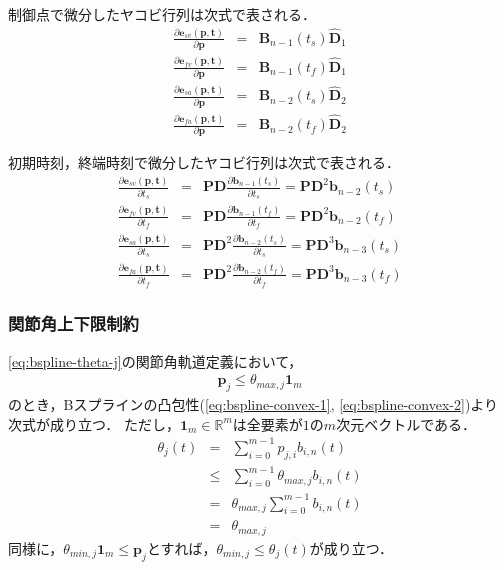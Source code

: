 制御点で微分したヤコビ行列は次式で表される．
\begin{eqnarray}
  \frac{\partial \bm{e}_{sv}(\bm{p}, \bm{t})}{\partial \bm{p}} &=& \bm{B}_{n-1}(t_s) \bm{\hat{D}}_1 \label{eq:bspline-stationery-task-jacobian-with-control-sv} \\
  \frac{\partial \bm{e}_{fv}(\bm{p}, \bm{t})}{\partial \bm{p}} &=& \bm{B}_{n-1}(t_f) \bm{\hat{D}}_1 \label{eq:bspline-stationery-task-jacobian-with-control-fv} \\
  \frac{\partial \bm{e}_{sa}(\bm{p}, \bm{t})}{\partial \bm{p}} &=& \bm{B}_{n-2}(t_s) \bm{\hat{D}}_2 \label{eq:bspline-stationery-task-jacobian-with-control-sa} \\
  \frac{\partial \bm{e}_{fa}(\bm{p}, \bm{t})}{\partial \bm{p}} &=& \bm{B}_{n-2}(t_f) \bm{\hat{D}}_2 \label{eq:bspline-stationery-task-jacobian-with-control-fa}
\end{eqnarray}

初期時刻，終端時刻で微分したヤコビ行列は次式で表される．
\begin{eqnarray}
  \frac{\partial \bm{e}_{sv}(\bm{p}, \bm{t})}{\partial t_s} &=& \bm{P} \bm{D} \frac{\partial \bm{b}_{n-1}(t_s)}{\partial t_s}
  = \bm{P} \bm{D}^2 \bm{b}_{n-2}(t_s) \label{eq:bspline-stationery-task-jacobian-with-timing-sv} \\
  \frac{\partial \bm{e}_{fv}(\bm{p}, \bm{t})}{\partial t_f} &=& \bm{P} \bm{D} \frac{\partial \bm{b}_{n-1}(t_f)}{\partial t_f}
  = \bm{P} \bm{D}^2 \bm{b}_{n-2}(t_f) \label{eq:bspline-stationery-task-jacobian-with-timing-fv} \\
  \frac{\partial \bm{e}_{sa}(\bm{p}, \bm{t})}{\partial t_s} &=& \bm{P} \bm{D}^2 \frac{\partial \bm{b}_{n-2}(t_s)}{\partial t_s}
  = \bm{P} \bm{D}^3 \bm{b}_{n-3}(t_s) \label{eq:bspline-stationery-task-jacobian-with-timing-sa} \\
  \frac{\partial \bm{e}_{fa}(\bm{p}, \bm{t})}{\partial t_f} &=& \bm{P} \bm{D}^2 \frac{\partial \bm{b}_{n-2}(t_f)}{\partial t_f}
  = \bm{P} \bm{D}^3 \bm{b}_{n-3}(t_f) \label{eq:bspline-stationery-task-jacobian-with-timing-fa}
\end{eqnarray}

\subsubsection*{関節角上下限制約}

\eqref{eq:bspline-theta-j}の関節角軌道定義において，
\begin{eqnarray}
  \bm{p}_j \leq \theta_{max,j} \bm{1}_m
\end{eqnarray}
のとき，Bスプラインの凸包性(\eqref{eq:bspline-convex-1}, \eqref{eq:bspline-convex-2})より次式が成り立つ．
ただし，$\bm{1}_m \in \mathbb{R}^m$は全要素が$1$の$m$次元ベクトルである．
\begin{eqnarray}
  \theta_j (t) &=& \sum_{i=0}^{m-1} p_{j,i} b_{i, n}(t) \\
  &\leq& \sum_{i=0}^{m-1} \theta_{max,j} b_{i, n}(t) \\
  &=& \theta_{max,j} \sum_{i=0}^{m-1} b_{i, n}(t) \\
  &=& \theta_{max,j}
\end{eqnarray}
同様に，$\theta_{min,j} \bm{1}_m \leq \bm{p}_j$とすれば，$\theta_{min,j} \leq \theta_j (t)$が成り立つ．

